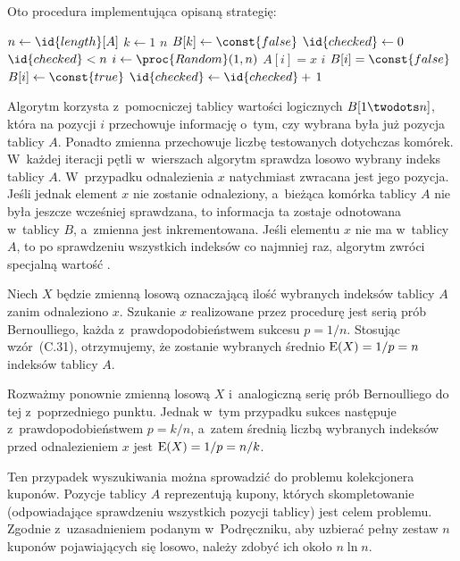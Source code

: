 \subproblem %
Oto procedura implementująca opisaną strategię:
\begin{codebox}
\li	$n\gets\id{length}[A]$
\li	\For $k\gets1$ \To $n$
\li		\Do $B[k]\gets\const{false}$
		\End
\li	$\id{checked}\gets0$
\li	\While $\id{checked}<n$ \label{li:random-search-while-begin}
\li		\Do
			$i\gets\proc{Random}(1,n)$
\li			\If $A[i]=x$
\li				\Then \Return $i$
				\End
\li			\If $B[i]=\const{false}$
\li				\Then
					$B[i]\gets\const{true}$
\li					$\id{checked}\gets\id{checked}+\,1$
				\End
		\End \label{li:random-search-while-end}
\li	\Return {}
\end{codebox}
Algorytm korzysta z~pomocniczej tablicy wartości logicznych $B[1\twodots n]$, która na pozycji $i$ przechowuje informację o~tym, czy wybrana była już  pozycja tablicy $A$. Ponadto zmienna  przechowuje liczbę testowanych dotychczas komórek. W~każdej iteracji pętli  w~wierszach \twodashes{\ref{li:random-search-while-begin}}{\ref{li:random-search-while-end}} algorytm sprawdza losowo wybrany indeks tablicy $A$. W~przypadku odnalezienia $x$ natychmiast zwracana jest jego pozycja. Jeśli jednak element $x$ nie zostanie odnaleziony, a~bieżąca komórka tablicy $A$ nie była jeszcze wcześniej sprawdzana, to informacja ta zostaje odnotowana w~tablicy $B$, a~zmienna  jest inkrementowana. Jeśli elementu $x$ nie ma w~tablicy $A$, to po sprawdzeniu wszystkich indeksów co najmniej raz, algorytm zwróci specjalną wartość .

\subproblem %
Niech $X$ będzie zmienną losową oznaczającą ilość wybranych indeksów tablicy $A$ zanim odnaleziono $x$. Szukanie $x$ realizowane przez procedurę  jest serią prób Bernoulliego, każda z~prawdopodobieństwem sukcesu $p=1/n$. Stosując wzór~(C.31), otrzymujemy, że zostanie wybranych średnio $\operatorname{E}(X)=1/p=n$ indeksów tablicy $A$.

\subproblem %
Rozważmy ponownie zmienną losową $X$ i~analogiczną serię prób Bernoulliego do tej z~poprzedniego punktu. Jednak w~tym przypadku sukces następuje z~prawdopodobieństwem $p=k/n$, a~zatem średnią liczbą wybranych indeksów przed odnalezieniem $x$ jest $\operatorname{E}(X)=1/p=n/k$.

\subproblem %
Ten przypadek wyszukiwania można sprowadzić do problemu kolekcjonera kuponów. Pozycje tablicy $A$ reprezentują kupony, których skompletowanie (odpowiadające sprawdzeniu wszystkich pozycji tablicy) jest celem problemu. Zgodnie z~uzasadnieniem podanym w~Podręczniku, aby uzbierać pełny zestaw $n$ kuponów pojawiających się losowo, należy zdobyć ich około $n\ln n$.

